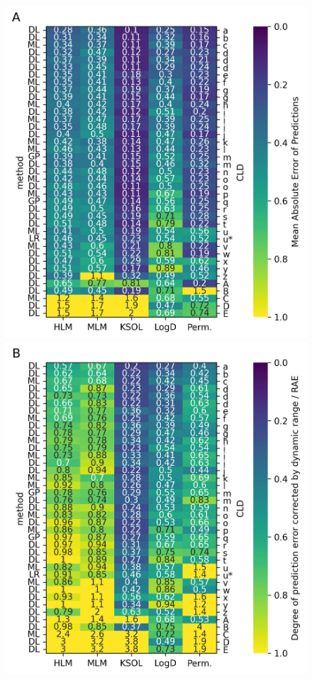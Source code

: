 \documentclass[journal=jcim,manuscript=article]{achemso}
\begin{document}
\begin{figure}
    \includegraphics[scale=0.6]{fig5_admet_leaderboard/Figure_PanelA.png}
    \includegraphics[scale=0.6]{fig5_admet_leaderboard/Figure_PanelB.png}

\end{figure}
\end{document}
